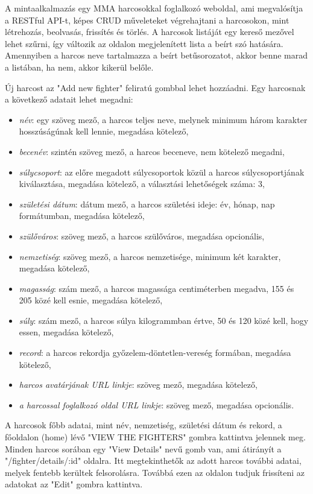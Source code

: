 
A mintaalkalmazás egy MMA harcosokkal foglalkozó weboldal, ami megvalósítja a RESTful API-t, képes CRUD műveleteket végrehajtani a harcosokon, mint létrehozás, beolvasás, frissítés és törlés. A harcosok listáját egy kereső mezővel lehet szűrni, így változik az oldalon megjelenített lista a beírt szó hatására. Amennyiben a harcos neve tartalmazza a beírt betűsorozatot, akkor benne marad a listában, ha nem, akkor kikerül belőle.

Új harcost az "Add new fighter" feliratú gombbal lehet hozzáadni. Egy harcosnak a következő adatait lehet megadni:

\begin{itemize}
\item \textit{név}: egy szöveg mező, a harcos teljes neve, melynek minimum három karakter hosszúságúnak kell lennie, megadása kötelező,
\item \textit{becenév}: szintén szöveg mező, a harcos beceneve, nem kötelező megadni,
\item \textit{súlycsoport}: az előre megadott súlycsoportok közül a harcos súlycsoportjának kiválasztása, megadása kötelező, a választási lehetőségek száma: 3,
\item \textit{születési dátum}: dátum mező, a harcos születési ideje: év, hónap, nap formátumban, megadása kötelező,
\item \textit{szülőváros}: szöveg mező, a harcos szülőváros, megadása opcionális,
\item \textit{nemzetiség}: szöveg mező, a harcos nemzetisége, minimum két karakter, megadása kötelező,
\item \textit{magasság}: szám mező, a harcos magassága centiméterben megadva, 155 és 205 közé kell esnie, megadása kötelező,
\item \textit{súly}: szám mező, a harcos súlya kilogrammban értve, 50 és 120 közé kell, hogy essen, megadása kötelező,
\item \textit{record}: a harcos rekordja győzelem-döntetlen-vereség formában, megadása kötelező,
\item \textit{harcos avatárjának URL linkje}: szöveg mező, megadása kötelező,
\item \textit{a harcossal foglalkozó oldal URL linkje}: szöveg mező, megadása opcionális.
\end{itemize}

A harcosok főbb adatai, mint név, nemzetiség, születési dátum és rekord, a főoldalon (home) lévő "VIEW THE FIGHTERS" gombra kattintva jelennek meg. Minden harcos sorában egy "View Details" nevű gomb van, ami átirányít a "/fighter/details/:id" oldalra. Itt megtekinthetők az adott harcos további adatai, melyek fentebb kerültek felsorolásra. Továbbá ezen az oldalon tudjuk frissíteni az adatokat az "Edit" gombra kattintva.

